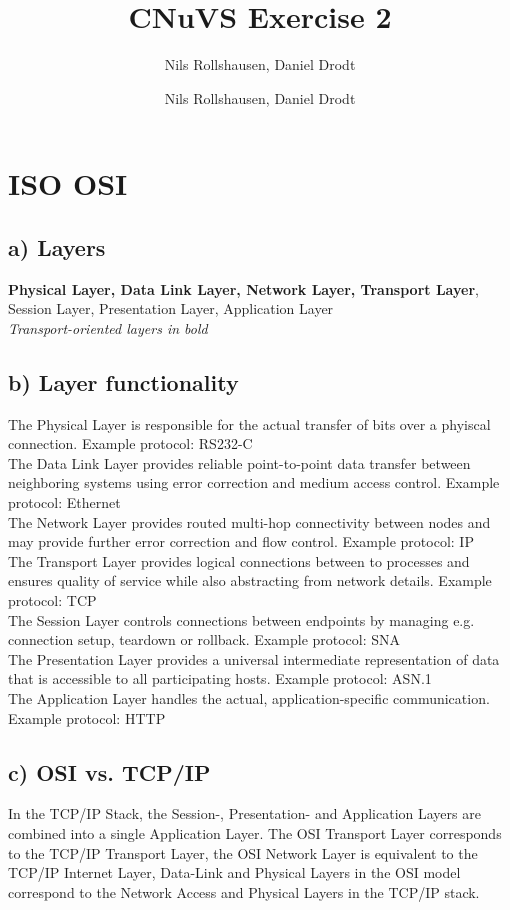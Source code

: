 \documentclass[a4paper, 11 pt, article, accentcolor=tud7b]{tudreport}
\title{CNuVS Exercise 2}
\author{Nils Rollshausen, Daniel Drodt}
\subtitle{Nils Rollshausen, Daniel Drodt}
\begin{document}
	\maketitle
	\section{ISO OSI}
	
	\subsection*{a) Layers}
	\textbf{Physical Layer, Data Link Layer, Network Layer, Transport Layer}, Session Layer, Presentation Layer, Application Layer \\
	\textit{Transport-oriented layers in bold}
	
	\subsection*{b) Layer functionality}
	The Physical Layer is responsible for the actual transfer of bits over a phyiscal connection. Example protocol: RS232-C\medskip \\
	The Data Link Layer provides reliable point-to-point data transfer between neighboring systems using error correction and medium access control. Example protocol: Ethernet \medskip \\
	The Network Layer provides routed multi-hop connectivity between nodes and may provide further error correction and flow control. Example protocol: IP \medskip \\
	The Transport Layer provides logical connections between to processes and ensures quality of service while also abstracting from network details. Example protocol: TCP \medskip \\
	The Session Layer controls connections between endpoints by managing e.g. connection setup, teardown or rollback. Example protocol: SNA\medskip \\
	The Presentation Layer provides a universal intermediate representation of data that is accessible to all participating hosts. Example protocol: ASN.1  \medskip \\
	The Application Layer handles the actual, application-specific communication. Example protocol: HTTP 
	
	\subsection*{c) OSI vs. TCP/IP}
	In the TCP/IP Stack, the Session-, Presentation- and Application Layers are combined into a single Application Layer. The OSI Transport Layer corresponds to the TCP/IP Transport Layer, the OSI Network Layer is equivalent to the TCP/IP Internet Layer, Data-Link and Physical Layers in the OSI model correspond to the Network Access and Physical Layers in the TCP/IP stack.
	
\end{document}
